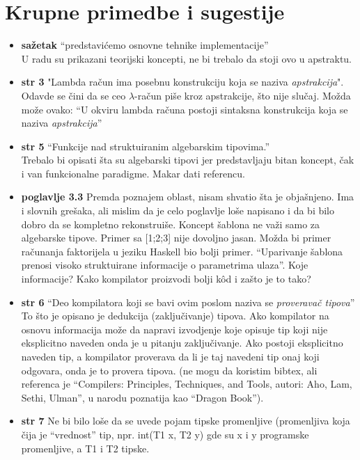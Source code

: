 \documentclass[a4paper]{report}
\begin{document}
\section{Krupne primedbe i sugestije}
\begin{itemize}
\item \textbf{sažetak} ``predstavićemo osnovne tehnike implementacije'' \\ U radu su prikazani teorijski koncepti, ne bi trebalo da stoji ovo u apstraktu.
\item \textbf{str 3} "Lambda račun ima posebnu konstrukciju koja se naziva \textit{apstrakcija}".\\Odavde se čini da se ceo $\lambda$-račun piše kroz apstrakcije, što nije slučaj. Možda može ovako: ``U okviru lambda računa postoji sintaksna konstrukcija koja se naziva \textit{apstrakcija}''
\item \textbf{str 5} ``Funkcije nad struktuiranim algebarskim tipovima.'' \\ Trebalo bi opisati šta su algebarski tipovi jer predstavljaju bitan koncept, čak i van funkcionalne paradigme. Makar dati referencu.
\item \textbf{poglavlje 3.3} Premda poznajem oblast, nisam shvatio šta je objašnjeno. Ima i slovnih grešaka, ali mislim da je celo poglavlje loše napisano i da bi bilo dobro da se kompletno rekonstruiše. Koncept šablona ne važi samo za algebarske tipove. Primer sa [1;2;3] nije dovoljno jasan. Možda bi primer računanja faktorijela u jeziku Haskell bio bolji primer. ``Uparivanje šablona prenosi visoko struktuirane informacije o parametrima ulaza''. Koje informacije? Kako kompilator proizvodi bolji kôd i zašto je to tako?
\item \textbf{str 6} ``Deo kompilatora koji se bavi ovim poslom naziva se \textit{proveravač tipova}'' \\ To što je opisano je dedukcija (zaključivanje) tipova. Ako kompilator na osnovu informacija može da napravi izvodjenje koje opisuje tip koji nije eksplicitno naveden onda je u pitanju zaključivanje. Ako postoji eksplicitno naveden tip, a kompilator proverava da li je taj navedeni tip onaj koji odgovara, onda je to provera tipova. (ne mogu da koristim bibtex, ali referenca je ``Compilers: Principles, Techniques, and Tools, autori: Aho, Lam, Sethi, Ulman'', u narodu poznatija kao ``Dragon Book'').
\item \textbf{str 7} Ne bi bilo loše da se uvede pojam tipske promenljive (promenljiva koja čija je ``vrednost'' tip, npr. int(T1 x, T2 y) gde su x i y programske promenljive, a T1 i T2 tipske.

\end{itemize}
\end{document}
